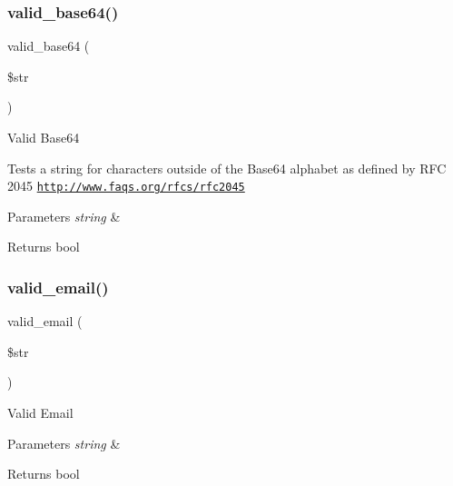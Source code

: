 \subsubsection{\texorpdfstring{valid\+\_\+base64()}{valid\_base64()}}
{\footnotesize\ttfamily valid\+\_\+base64 (\begin{DoxyParamCaption}\item[{}]{\$str }\end{DoxyParamCaption})}

Valid Base64

Tests a string for characters outside of the Base64 alphabet as defined by R\+FC 2045 \href{http://www.faqs.org/rfcs/rfc2045}{\tt http\+://www.\+faqs.\+org/rfcs/rfc2045}


\begin{DoxyParams}{Parameters}
{\em string} & \\
\hline
\end{DoxyParams}
\begin{DoxyReturn}{Returns}
bool 
\end{DoxyReturn}
\mbox{\label{class_c_i___form__validation_af7d43edae9c6e388390176b3c62de140}} 
\subsubsection{\texorpdfstring{valid\+\_\+email()}{valid\_email()}}
{\footnotesize\ttfamily valid\+\_\+email (\begin{DoxyParamCaption}\item[{}]{\$str }\end{DoxyParamCaption})}

Valid Email


\begin{DoxyParams}{Parameters}
{\em string} & \\
\hline
\end{DoxyParams}
\begin{DoxyReturn}{Returns}
bool 
\end{DoxyReturn}
\mbox{\label{class_c_i___form__validation_a7692019b59978c17621e3920823621c4}} 
